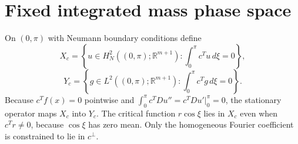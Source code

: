 \section*{Fixed integrated mass phase space}
On $(0,\pi)$ with Neumann boundary conditions define
\[
X_c=\left\{u\in H_N^2((0,\pi);\mathbb R^{m+1}):
\int_0^\pi c^Tu\,d\xi=0\right\},
\]
\[
Y_c=\left\{g\in L^2((0,\pi);\mathbb R^{m+1}):
\int_0^\pi c^Tg\,d\xi=0\right\}.
\]
Because $c^Tf(x)=0$ pointwise and
$\int_0^\pi c^TDu''=c^TDu'|_0^\pi=0$, the stationary operator maps
$X_c$ into $Y_c$.  The critical function $r\cos\xi$ lies in $X_c$ even when
$c^Tr\neq0$, because $\cos\xi$ has zero mean.  Only the homogeneous Fourier
coefficient is constrained to lie in $c^\perp$.
